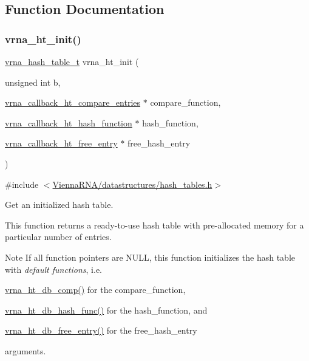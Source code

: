 \subsection{Function Documentation}
\mbox{\label{group__hash__table__utils_ga37d1c7e13087a2b7c1b87fda34577c29}} 
\subsubsection{\texorpdfstring{vrna\+\_\+ht\+\_\+init()}{vrna\_ht\_init()}}
{\footnotesize\ttfamily \hyperlink{group__hash__table__utils_gabc7c6f41b718c8e23929e528891a89c4}{vrna\+\_\+hash\+\_\+table\+\_\+t} vrna\+\_\+ht\+\_\+init (\begin{DoxyParamCaption}\item[{unsigned int}]{b,  }\item[{\hyperlink{group__hash__table__utils_gace4adf608f9dc246f66f6264d30c0f8d}{vrna\+\_\+callback\+\_\+ht\+\_\+compare\+\_\+entries} $\ast$}]{compare\+\_\+function,  }\item[{\hyperlink{group__hash__table__utils_ga8533dc0cb44035d5fdb05e3c28922d2b}{vrna\+\_\+callback\+\_\+ht\+\_\+hash\+\_\+function} $\ast$}]{hash\+\_\+function,  }\item[{\hyperlink{group__hash__table__utils_ga3ff18cc70db8bb6f8cfee2c2b1542afc}{vrna\+\_\+callback\+\_\+ht\+\_\+free\+\_\+entry} $\ast$}]{free\+\_\+hash\+\_\+entry }\end{DoxyParamCaption})}



{\ttfamily \#include $<$\hyperlink{hash__tables_8h}{Vienna\+R\+N\+A/datastructures/hash\+\_\+tables.\+h}$>$}



Get an initialized hash table. 

This function returns a ready-\/to-\/use hash table with pre-\/allocated memory for a particular number of entries.

\begin{DoxyNote}{Note}
If all function pointers are {\ttfamily N\+U\+LL}, this function initializes the hash table with {\itshape default functions}, i.\+e.
\begin{DoxyItemize}
\item \hyperlink{group__hash__table__utils_gac4ec0b8372d50d7347a63f140f340962}{vrna\+\_\+ht\+\_\+db\+\_\+comp()} for the {\ttfamily compare\+\_\+function},
\item \hyperlink{group__hash__table__utils_gad133721a3cd2f8ca259fe315d86035a7}{vrna\+\_\+ht\+\_\+db\+\_\+hash\+\_\+func()} for the {\ttfamily hash\+\_\+function}, and
\item \hyperlink{group__hash__table__utils_gabcdcd0d070b3dfd2634a09e7838acf66}{vrna\+\_\+ht\+\_\+db\+\_\+free\+\_\+entry()} for the {\ttfamily free\+\_\+hash\+\_\+entry} 
\end{DoxyItemize}

arguments. 
\end{DoxyNote}


